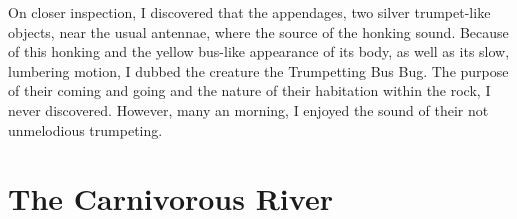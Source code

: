 \documentclass[10pt,twoside,openright]{memoir}
\begin{document}
On closer inspection, I discovered that the appendages, two silver trumpet-like objects, near the usual antennae, where the source of the honking sound.  Because of this honking and the yellow bus-like appearance of its body, as well as its slow, lumbering motion, I dubbed the creature the Trumpetting Bus Bug.  The purpose of their coming and going and the nature of their habitation within the rock, I never discovered.  However, many an morning, I enjoyed the sound of their not unmelodious trumpeting.



\chapter{The Carnivorous River}

\end{document}
